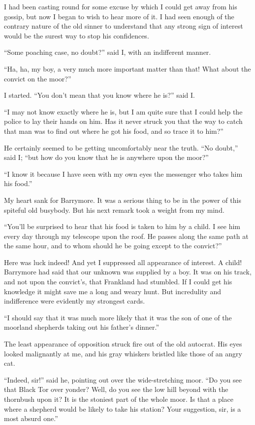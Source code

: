\documentclass[paper=5.5in:8.5in,BCOR=7mm,twoside,DIV=calc,12pt,usegeometry,openany,chapterprefix,endperiod,headings=big]{scrbook} %
\begin{document}
I had been casting round for some excuse by which I could get away from his gossip, but now I began to wish to hear more of it. I had seen enough of the contrary nature of the old sinner to understand that any strong sign of interest would be the surest way to stop his confidences.

\enquote{Some poaching case, no doubt?} said I, with an indifferent manner.

\enquote{Ha, ha, my boy, a very much more important matter than that! What about the convict on the moor?}

I started. \enquote{You don't mean that you know where he is?} said I.

\enquote{I may not know exactly where he is, but I am quite sure that I could help the police to lay their hands on him. Has it never struck you that the way to catch that man was to find out where he got his food, and so trace it to him?}

He certainly seemed to be getting uncomfortably near the truth. \enquote{No doubt,} said I; \enquote{but how do you know that he is anywhere upon the moor?}

\enquote{I know it because I have seen with my own eyes the messenger who takes him his food.}

My heart sank for Barrymore. It was a serious thing to be in the power of this spiteful old busybody. But his next remark took a weight from my mind.

\enquote{You'll be surprised to hear that his food is taken to him by a child. I see him every day through my telescope upon the roof. He passes along the same path at the same hour, and to whom should he be going except to the convict?}

Here was luck indeed! And yet I suppressed all appearance of interest. A child! Barrymore had said that our unknown was supplied by a boy. It was on his track, and not upon the convict's, that Frankland had stumbled. If I could get his knowledge it might save me a long and weary hunt. But incredulity and indifference were evidently my strongest cards.

\enquote{I should say that it was much more likely that it was the son of one of the moorland shepherds taking out his father's dinner.}

The least appearance of opposition struck fire out of the old autocrat. His eyes looked malignantly at me, and his gray whiskers bristled like those of an angry cat.

\enquote{Indeed, sir!} said he, pointing out over the wide-stretching moor. \enquote{Do you see that Black Tor over yonder? Well, do you see the low hill beyond with the thornbush upon it? It is the stoniest part of the whole moor. Is that a place where a shepherd would be likely to take his station? Your suggestion, sir, is a most absurd one.}
\end{document}
